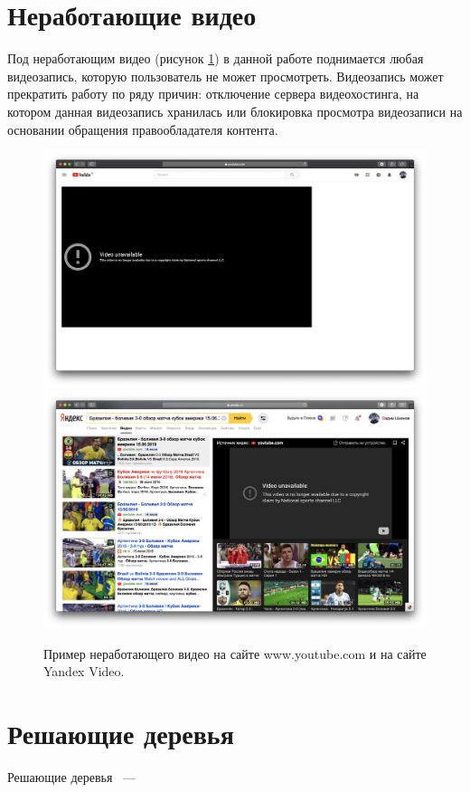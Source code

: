 \section{Неработающие видео}

Под неработающим видео (рисунок \ref{fig:bad_video}) в данной работе поднимается любая видеозапись, которую пользователь не может просмотреть. Видеозапись может прекратить работу по ряду причин: отключение сервера видеохостинга, на котором данная видеозапись хранилась или блокировка просмотра видеозаписи на основании обращения правообладателя контента.

\begin{figure}
    \centering
    \includegraphics[width=\textwidth]{../images/youtube_bad.png}
    \includegraphics[width=\textwidth]{../images/yandex_video_bad.png}
    \caption{Пример неработающего видео на сайте www.youtube.com и на сайте Yandex Video.}
    \label{fig:bad_video}
\end{figure}

\section{Решающие деревья}

Решающие деревья \cite{Breiman2017}~---